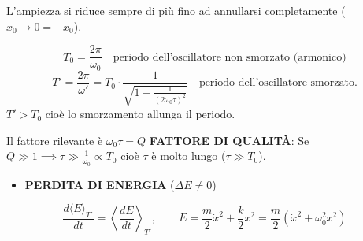 \documentclass{article}
\begin{document}
\vspace{0.5cm}
\begin{minipage}{0.4\textwidth}
L'ampiezza si riduce sempre di più fino ad annullarsi completamente ($x_0 \to 0 = -x_0$).
\end{minipage}
\hfill
\begin{minipage}{0.5\textwidth}
\end{minipage}

\vspace{0.5cm}
\begin{equation*}
T_0 = \frac{2\pi}{\omega_0} \quad \text{periodo dell'oscillatore non smorzato (armonico)}
\end{equation*}
\begin{equation*}
T' = \frac{2\pi}{\omega'} = T_0 \cdot \frac{1}{\sqrt{1 - \frac{1}{(2\omega_0 \tau)^2}}} \quad \text{periodo dell'oscillatore smorzato.}
\end{equation*}
$T' > T_0$ cioè lo smorzamento allunga il periodo.

Il fattore rilevante è $\omega_0 \tau = Q$ \textbf{FATTORE DI QUALITÀ}:
Se $Q \gg 1 \implies \tau \gg \frac{1}{\omega_0} \propto T_0$ cioè $\tau$ è molto lungo ($\tau \gg T_0$).

\begin{itemize}
\item \textbf{PERDITA DI ENERGIA} ($\Delta E \neq 0$)
\end{itemize}
\begin{equation*}
\frac{d \langle E \rangle_{T'}}{dt} = \left\langle \frac{dE}{dt} \right\rangle_{T'}, \qquad E = \frac{m}{2} \dot{x}^2 + \frac{k}{2} x^2 = \frac{m}{2} (\dot{x}^2 + \omega_0^2 x^2)
\end{equation*}
\end{document}
